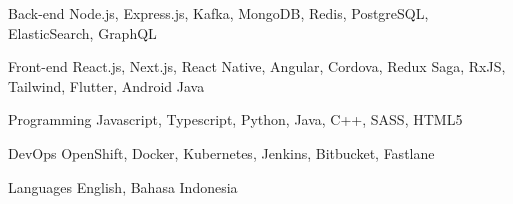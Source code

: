 

\begin{cvskills}

  \cvskill
    {Back-end} %
    {Node.js, Express.js, Kafka, MongoDB, Redis, PostgreSQL, ElasticSearch, GraphQL} %

  \cvskill
    {Front-end} %
    {React.js, Next.js, React Native, Angular, Cordova, Redux Saga, RxJS, Tailwind, Flutter, Android Java} %

  \cvskill
    {Programming} %
    {Javascript, Typescript, Python, Java, C++, SASS, HTML5} %

  \cvskill
    {DevOps} %
    {OpenShift, Docker, Kubernetes, Jenkins, Bitbucket, Fastlane} %

  \cvskill
    {Languages} %
    {English, Bahasa Indonesia} %

\end{cvskills}

